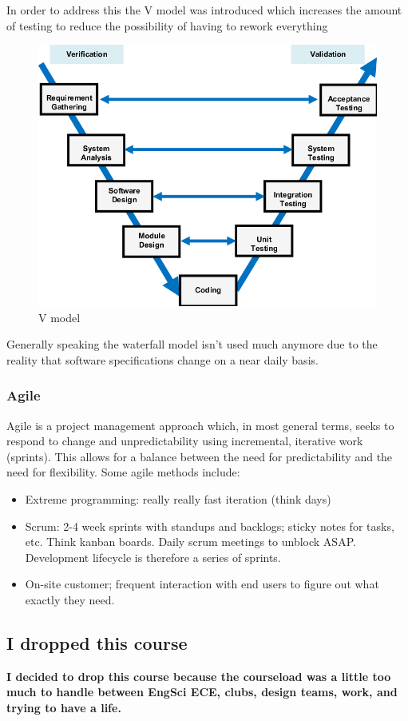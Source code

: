 \documentclass[10pt]{article}
\begin{document}
In order to address this the V model was introduced which increases the amount of testing to reduce the possibility of having to rework everything
\begin{figure}[H]
	\centering
	\includegraphics[width=0.8\linewidth]{img/image_2022-09-14-14-36-18.png}
	\caption{V model}
\end{figure}

Generally speaking the waterfall model isn't used much anymore due to the reality that software specifications change on a near daily basis.


\subsubsection{Agile}

Agile is a project management approach which, in most general terms, seeks to respond to change and unpredictability using incremental, iterative work (sprints).
This allows for a balance between the need for predictability and the need for flexibility.
Some agile methods include:
\begin{itemize}
	\item Extreme programming: really really fast iteration (think days)
	\item Scrum: 2-4 week sprints with standups and backlogs; sticky notes for tasks, etc. Think kanban boards. Daily scrum meetings to unblock ASAP. Development lifecycle is therefore a series of sprints.
	\item On-site customer; frequent interaction with end users to figure out what exactly they need.
\end{itemize}


\subsection{I dropped this course}
\textbf{I decided to drop this course because the courseload was a little too much to handle between EngSci ECE, clubs, design teams, work, and trying to have a life.} 
\end{document}
